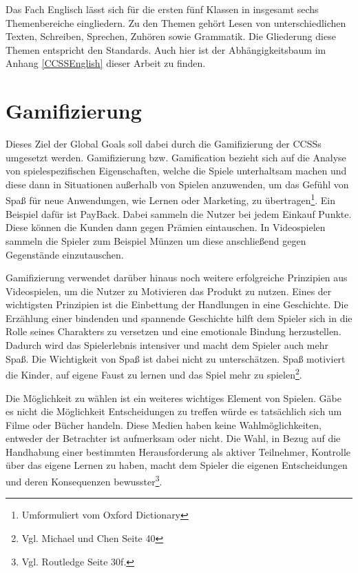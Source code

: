 Das Fach Englisch lässt sich für die ersten fünf Klassen in insgesamt sechs Themenbereiche eingliedern. Zu den Themen gehört Lesen von unterschiedlichen Texten, Schreiben, Sprechen, Zuhören sowie Grammatik. Die Gliederung diese Themen entspricht den Standards. Auch hier ist der Abhängigkeitsbaum im Anhang \ref{CCSSEnglish} dieser Arbeit zu finden.

\section{Gamifizierung}
Dieses Ziel der Global Goals soll dabei durch die Gamifizierung der \acp{CCSS} umgesetzt werden. Gamifizierung bzw. Gamification bezieht sich auf die Analyse von spielespezifischen Eigenschaften, welche die Spiele unterhaltsam machen und diese dann in Situationen außerhalb von Spielen anzuwenden, um das Gefühl von Spaß für neue Anwendungen, wie Lernen oder Marketing, zu übertragen\footnote{Umformuliert vom Oxford Dictionary}. Ein Beispiel dafür ist PayBack. Dabei sammeln die Nutzer bei jedem Einkauf Punkte. Diese können die Kunden dann gegen Prämien eintauschen. In Videospielen sammeln die Spieler zum Beispiel Münzen um diese anschließend gegen Gegenstände einzutauschen. 

Gamifizierung verwendet darüber hinaus noch weitere erfolgreiche Prinzipien aus Videospielen, um die Nutzer zu Motivieren das Produkt zu nutzen. Eines der wichtigsten Prinzipien ist die Einbettung der Handlungen in eine Geschichte. Die Erzählung einer bindenden und spannende Geschichte hilft dem Spieler sich in die Rolle seines Charakters zu versetzen und eine emotionale Bindung herzustellen. Dadurch wird das Spielerlebnis intensiver und macht dem Spieler auch mehr Spaß. Die Wichtigkeit von Spaß ist dabei nicht zu unterschätzen. Spaß motiviert die Kinder, auf eigene Faust zu lernen und das Spiel mehr zu spielen\footnote{Vgl. Michael und Chen \cite{seriousGamesFun} Seite 40}.

Die Möglichkeit zu wählen ist ein weiteres wichtiges Element von Spielen. Gäbe es nicht die Möglichkeit Entscheidungen zu treffen würde es tatsächlich sich um Filme oder Bücher handeln. Diese Medien haben keine Wahlmöglichkeiten, entweder der Betrachter ist aufmerksam oder nicht. Die Wahl, in Bezug auf die Handhabung einer bestimmten Herausforderung als aktiver Teilnehmer, Kontrolle über das eigene Lernen zu haben, macht dem Spieler die eigenen Entscheidungen und deren Konsequenzen bewusster\footnote{Vgl. Routledge \cite{seriousGamesPrinciples} Seite 30f.}.

